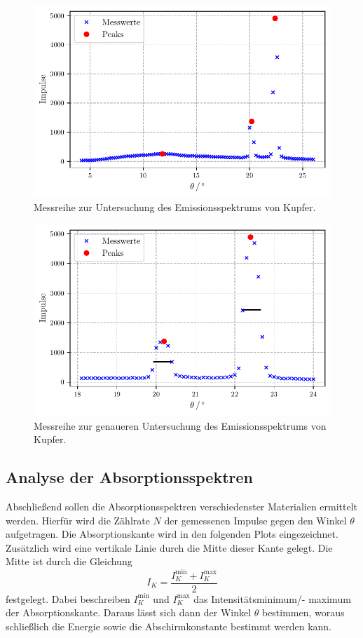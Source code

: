 \begin{figure}
  \centering
  \caption{Messreihe zur Untersuchung des Emissionsspektrums von Kupfer.}
  \label{fig:kupfer1}
  \includegraphics[width=0.5 \linewidth]{build/kupfer1.pdf}
\end{figure}

\begin{figure}
  \centering
  \caption{ Messreihe zur genaueren Untersuchung des Emissionsspektrums von Kupfer.}
  \label{fig:kupfer2}
  \includegraphics[width=0.5 \linewidth]{build/kupfer2.pdf}
\end{figure}

\subsection{Analyse der Absorptionsspektren}

Abschließend sollen die Absorptionsspektren verschiedenster Materialien ermittelt werden.
Hierfür wird die Zählrate $N$ der gemessenen Impulse gegen den Winkel $\theta$ aufgetragen.
Die Absorptionskante wird in den folgenden Plots eingezeichnet.
Zusätzlich wird eine vertikale Linie durch die Mitte dieser Kante gelegt.
Die Mitte ist durch die Gleichung
\begin{equation*}
  I_K = \frac{I_K^\text{min} + I_K^\text{max}}{2}
\end{equation*}
festgelegt. Dabei beschreiben $I_K^\text{min}$ und $I_K^\text{max}$ das Intensitätsminimum/- maximum der Absorptionskante.
Daraus lässt sich dann der Winkel $\theta$ bestimmen, woraus schließlich die Energie sowie die Abschirmkonstante bestimmt werden kann.

